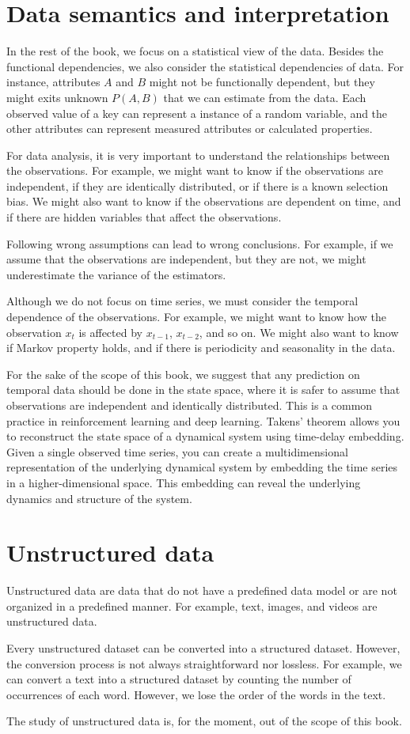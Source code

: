 \section{Data semantics and interpretation}

In the rest of the book, we focus on a statistical view of the data.  Besides the
functional dependencies, we also consider the statistical dependencies of data.  For
instance, attributes $A$ and $B$ might not be functionally dependent, but they might exits
unknown $P(A, B)$ that we can estimate from the data.  Each observed value of a key can
represent a instance of a random variable, and the other attributes can represent
measured attributes or calculated properties.

For data analysis, it is very important to understand the relationships between the
observations.  For example, we might want to know if the observations are independent, if
they are identically distributed, or if there is a known selection bias.  We might also
want to know if the observations are dependent on time, and if there are hidden variables
that affect the observations.

Following wrong assumptions can lead to wrong conclusions.  For example, if we assume that
the observations are independent, but they are not, we might underestimate the variance of
the estimators.

Although we do not focus on time series, we must consider the temporal dependence of the
observations.  For example, we might want to know how the observation $x_t$ is affected by
$x_{t-1}$, $x_{t-2}$, and so on.  We might also want to know if Markov property holds,
and if there is periodicity and seasonality in the data.

For the sake of the scope of this book, we suggest that any prediction on temporal data
should be done in the state space, where it is safer to assume that observations are
independent and identically distributed.  This is a common practice in reinforcement
learning and deep learning. Takens' theorem allows you to
reconstruct the state space of a dynamical system using time-delay embedding. Given a
single observed time series, you can create a multidimensional representation of the
underlying dynamical system by embedding the time series in a higher-dimensional space.
This embedding can reveal the underlying dynamics and structure of the system.

\section{Unstructured data}

Unstructured data are data that do not have a predefined data model or are not organized
in a predefined manner.  For example, text, images, and videos are unstructured data.

Every unstructured dataset can be converted into a structured dataset.  However, the
conversion process is not always straightforward nor lossless.  For example, we can
convert a text into a structured dataset by counting the number of occurrences of each
word.  However, we lose the order of the words in the text.

The study of unstructured data is, for the moment, out of the scope of this book.

